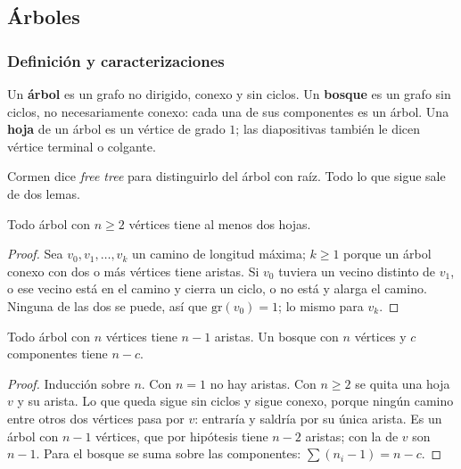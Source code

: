 \documentclass[11pt,letterpaper]{article}
\begin{document}

\subsection*{Árboles}

\subsubsection*{Definición y caracterizaciones}

\begin{definicion}
  \label{def:arbol}
  Un \textbf{árbol} es un grafo no dirigido, conexo y sin ciclos. Un
  \textbf{bosque} es un grafo sin ciclos, no necesariamente conexo:
  cada una de sus componentes es un árbol. Una \textbf{hoja} de un
  árbol es un vértice de grado $1$; las diapositivas también le dicen
  vértice terminal o colgante.
\end{definicion}

Cormen dice \textit{free tree} para distinguirlo del árbol con raíz.
Todo lo que sigue sale de dos lemas.

\begin{lema}[Hojas]
  \label{lem:arbol-hojas}
  Todo árbol con $n \ge 2$ vértices tiene al menos dos hojas.
\end{lema}

\begin{proof}
  Sea $v_0, v_1, \dots, v_k$ un camino de longitud máxima; $k \ge 1$
  porque un árbol conexo con dos o más vértices tiene aristas. Si
  $v_0$ tuviera un vecino distinto de $v_1$, o ese vecino está en el
  camino y cierra un ciclo, o no está y alarga el camino. Ninguna de
  las dos se puede, así que $\text{gr}(v_0) = 1$; lo mismo para
  $v_k$.
\end{proof}

\begin{lema}[Aristas]
  \label{lem:arbol-aristas}
  Todo árbol con $n$ vértices tiene $n - 1$ aristas. Un bosque con
  $n$ vértices y $c$ componentes tiene $n - c$.
\end{lema}

\begin{proof}
  Inducción sobre $n$. Con $n = 1$ no hay aristas. Con $n \ge 2$ se
  quita una hoja $v$ y su arista. Lo que queda sigue sin ciclos y
  sigue conexo, porque ningún camino entre otros dos vértices pasa
  por $v$: entraría y saldría por su única arista. Es un árbol con
  $n - 1$ vértices, que por hipótesis tiene $n - 2$ aristas; con la
  de $v$ son $n - 1$. Para el bosque se suma sobre las componentes:
  $\sum (n_i - 1) = n - c$.
\end{proof}
\end{document}
